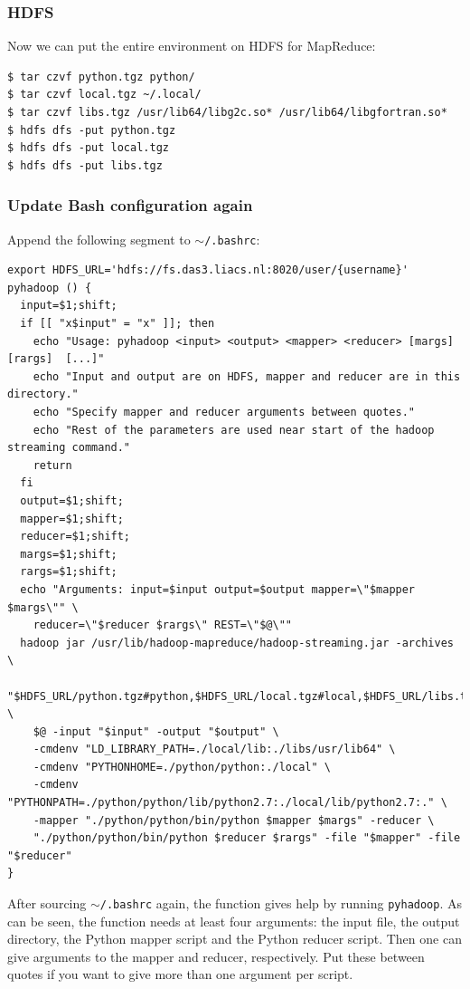\documentclass{article}
\begin{document}
\subsubsection{HDFS}\label{app:hdfs}
Now we can put the entire environment on HDFS for MapReduce:

\begin{verbatim}
$ tar czvf python.tgz python/
$ tar czvf local.tgz ~/.local/
$ tar czvf libs.tgz /usr/lib64/libg2c.so* /usr/lib64/libgfortran.so*
$ hdfs dfs -put python.tgz
$ hdfs dfs -put local.tgz
$ hdfs dfs -put libs.tgz
\end{verbatim}

\subsubsection{Update Bash configuration again}\label{app:update-bashrc-again}

Append the following segment to \texttt{$\sim$/.bashrc}:

\begin{verbatim}
export HDFS_URL='hdfs://fs.das3.liacs.nl:8020/user/{username}'
pyhadoop () {
  input=$1;shift;
  if [[ "x$input" = "x" ]]; then
    echo "Usage: pyhadoop <input> <output> <mapper> <reducer> [margs] [rargs]  [...]"
    echo "Input and output are on HDFS, mapper and reducer are in this directory."
    echo "Specify mapper and reducer arguments between quotes."
    echo "Rest of the parameters are used near start of the hadoop streaming command."
    return
  fi
  output=$1;shift;
  mapper=$1;shift;
  reducer=$1;shift;
  margs=$1;shift;
  rargs=$1;shift;
  echo "Arguments: input=$input output=$output mapper=\"$mapper $margs\"" \
    reducer=\"$reducer $rargs\" REST=\"$@\""
  hadoop jar /usr/lib/hadoop-mapreduce/hadoop-streaming.jar -archives \
    "$HDFS_URL/python.tgz#python,$HDFS_URL/local.tgz#local,$HDFS_URL/libs.tgz#libs" \
    $@ -input "$input" -output "$output" \
    -cmdenv "LD_LIBRARY_PATH=./local/lib:./libs/usr/lib64" \
    -cmdenv "PYTHONHOME=./python/python:./local" \
    -cmdenv "PYTHONPATH=./python/python/lib/python2.7:./local/lib/python2.7:." \
    -mapper "./python/python/bin/python $mapper $margs" -reducer \
    "./python/python/bin/python $reducer $rargs" -file "$mapper" -file "$reducer"
}
\end{verbatim}

After sourcing \texttt{$\sim$/.bashrc} again, the function gives help by 
running \texttt{pyhadoop}. As can be seen, the function needs at least four 
arguments: the input file, the output directory, the Python mapper script and 
the Python reducer script. Then one can give arguments to the mapper and 
reducer, respectively. Put these between quotes if you want to give more than 
one argument per script.
\end{document}
